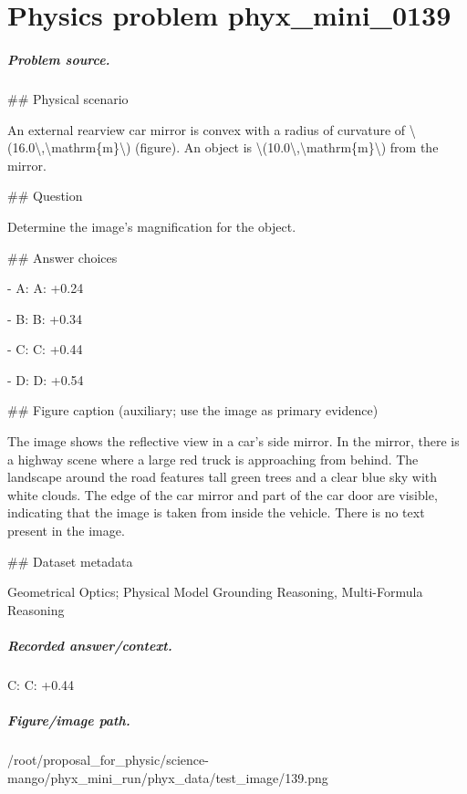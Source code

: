 
\chapter{Physics problem phyx\_mini\_0139}
\label{ch:PhyXMiniProblems_problem_phyx_mini_0139}

\paragraph{Problem source.}
\#\# Physical scenario

An external rearview car mirror is convex with a radius of curvature of \textbackslash{}(16.0\textbackslash{},\textbackslash{}mathrm\{m\}\textbackslash{}) (figure). An object is \textbackslash{}(10.0\textbackslash{},\textbackslash{}mathrm\{m\}\textbackslash{}) from the mirror.

\#\# Question

Determine the image's magnification for the object.

\#\# Answer choices

- A: A: +0.24

- B: B: +0.34

- C: C: +0.44

- D: D: +0.54

\#\# Figure caption (auxiliary; use the image as primary evidence)

The image shows the reflective view in a car's side mirror. In the mirror, there is a highway scene where a large red truck is approaching from behind. The landscape around the road features tall green trees and a clear blue sky with white clouds. The edge of the car mirror and part of the car door are visible, indicating that the image is taken from inside the vehicle. There is no text present in the image.

\#\# Dataset metadata

Geometrical Optics; Physical Model Grounding Reasoning, Multi-Formula Reasoning

\paragraph{Recorded answer/context.}
C: C: +0.44

\paragraph{Figure/image path.}
/root/proposal\_for\_physic/science-mango/phyx\_mini\_run/phyx\_data/test\_image/139.png

